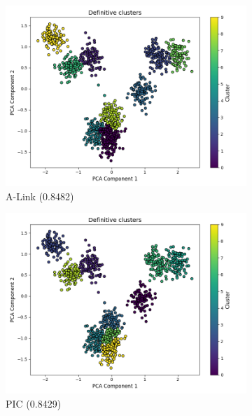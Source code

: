 \documentclass[
	10pt,
	parskip=half-,	
	paper=a4,
	english
	]{scrartcl}
\begin{document}
\begin{figure}[ht]
    \centering
    \begin{subfigure}[b]{0.3\textwidth}
        \includegraphics[width=\textwidth]{../data/plots/synthetic_noise_blobs_blobs_A-Link_structural_0.png}
        \caption{A-Link (0.8482)}
    \end{subfigure}
    \begin{subfigure}[b]{0.3\textwidth}
        \includegraphics[width=\textwidth]{../data/plots/synthetic_noise_blobs_blobs_PIC_structural_0.png}
        \caption{PIC (0.8429)}
    \end{subfigure}
    \begin{subfigure}[b]{0.3\textwidth}

\end{subfigure}
\end{figure}
\end{document}
